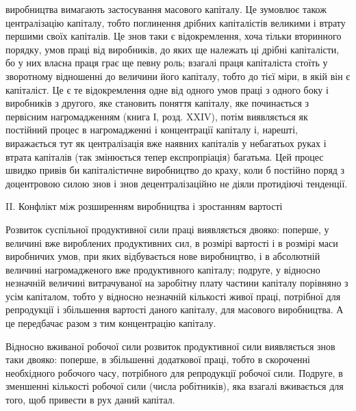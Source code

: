 \parcont{}  %
виробництва вимагають застосування масового капіталу. Це зумовлює
також централізацію капіталу, тобто поглинення дрібних
капіталістів великими і втрату першими своїх капіталів. Це знов
таки є відокремлення, хоча тільки вторинного порядку, умов праці
від виробників, до яких ще належать ці дрібні капіталісти, бо
у них власна праця грає ще певну роль; взагалі праця капіталіста
стоїть у зворотному відношенні до величини його капіталу, тобто
до тієї міри, в якій він є капіталіст. Це є те відокремлення одне
від одного умов праці з одного боку і виробників з другого,
яке становить поняття капіталу, яке починається з первісним
нагромадженням (книга І, розд. XXIV), потім виявляється як постійний
процес в нагромадженні і концентрації капіталу і, нарешті,
виражається тут як централізація вже наявних капіталів у небагатьох
руках і втрата капіталів (так змінюється тепер експропріація)
багатьма. Цей процес швидко привів би капіталістичне
виробництво до краху, коли б постійно поряд з доцентровою
силою знов і знов децентралізаційно не діяли протидіючі тенденції.

II. Конфлікт між розширенням виробництва
і зростанням вартості

Розвиток суспільної продуктивної сили праці виявляється
двояко: поперше, у величині вже вироблених продуктивних сил,
в розмірі вартості і в розмірі маси виробничих умов, при яких
відбувається нове виробництво, і в абсолютній величині нагромадженого
вже продуктивного капіталу; подруге, у відносно
незначній величині витрачуваної на заробітну плату частини
капіталу порівняно з усім капіталом, тобто у відносно незначній
кількості живої праці, потрібної для репродукції і збільшення
вартості даного капіталу, для масового виробництва. А це передбачає
разом з тим концентрацію капіталу.

Відносно вживаної робочої сили розвиток продуктивної сили
виявляється знов таки двояко: поперше, в збільшенні додаткової
праці, тобто в скороченні необхідного робочого часу, потрібного
для репродукції робочої сили. Подруге, в зменшенні кількості
робочої сили (числа робітників), яка взагалі вживається для
того, щоб привести в рух даний капітал.

